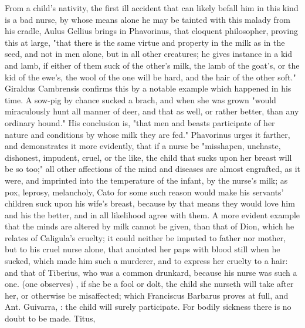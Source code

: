 From a child's nativity, the first ill accident that can likely befall him in
this kind is a bad nurse, by whose means alone he may be tainted with this
malady from his cradle, Aulus Gellius
 brings in Phavorinus, that eloquent
philosopher, proving this at large, "that there is the
same virtue and property in the milk as in the seed, and not in men alone, but
in all other creatures; he gives instance in a kid and lamb, if either of them
suck of the other's milk, the lamb of the goat's, or the kid of the ewe's, the
wool of the one will be hard, and the hair of the other soft." Giraldus
Cambrensis  confirms this
by a notable example which happened in his time. A sow-pig by chance sucked a
brach, and when she was grown "would miraculously hunt all
manner of deer, and that as well, or rather better, than any ordinary hound."
His conclusion is, "that men and beasts participate of her
nature and conditions by whose milk they are fed." Phavorinus urges it farther,
and demonstrates it more evidently, that if a nurse be
"misshapen, unchaste, dishonest, impudent,
cruel, or the like, the child that sucks upon her breast
will be so too;" all other affections of the mind and diseases are almost
engrafted, as it were, and imprinted into the temperature of the infant, by the
nurse's milk; as pox, leprosy, melancholy, \etc{} Cato for some such reason
would make his servants' children suck upon his wife's breast, because by that
means they would love him and his the better, and in all likelihood agree with
them. A more evident example that the minds are altered by milk cannot be
given, than that of Dion, which he relates of Caligula's
cruelty; it could neither be imputed to father nor mother, but to his cruel
nurse alone, that anointed her paps with blood still when he sucked, which made
him such a murderer, and to express her cruelty to a hair: and that of
Tiberius, who was a common drunkard, because his nurse was such a one.  (one observes) , if she be a fool or dolt, the child she nurseth will take after her,
or otherwise be misaffected; which Franciscus Barbarus  proves at full, and Ant. Guivarra,
: the child will surely
participate. For bodily sickness there is no doubt to be made. Titus,
